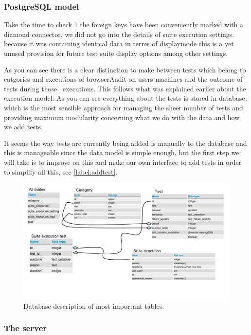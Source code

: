 \subsubsection{PostgreSQL model}

Take the time to check \ref{fig:model} the foreign keys have been conveniently marked with a diamond connector, we did not go into the details of suite execution settings.
because it was containing identical data in terms of displaymode this is a yet unused provision for future test suite display options among other settings.

As you can see there is a clear distinction to make between 
tests which belong to catgories and executions of browserAudit on users machines and the outcome of tests during those \
executions. This follows what was explained earlier about the execution model. As you can see everything about the tests is stored in database, which is the most sensible
approach for managing the sheer number of tests and providing maximum modularity concerning what we do with the data and how we add tests.\

It seems the way tests are currently being added is manually to the database and this is manageable since the data model is simple enough, but the first step we will
take is to improve on this and make our own interface to add tests in order to simplify all this, see \ref{label:addtest}.

\begin{figure}
\centering
\includegraphics[width=1\textwidth]{db.pdf}
\caption{\label{fig:model}Database description of most important tables.}
\end{figure}


\subsubsection{The server}

